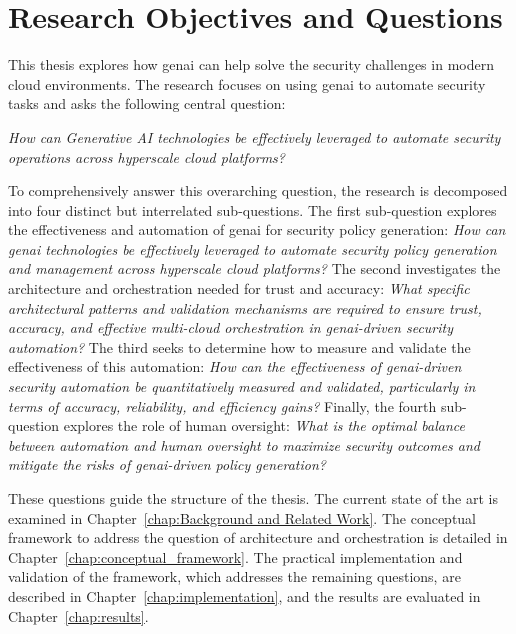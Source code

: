 \section{Research Objectives and Questions}
\label{sec:objectives_questions}

This thesis explores how \gls{genai} can help solve the security challenges in modern cloud environments. The research focuses on using \gls{genai} to automate security tasks and asks the following central question:

\textit{How can Generative AI technologies be effectively leveraged to automate security operations across hyperscale cloud platforms?}

To comprehensively answer this overarching question, the research is decomposed into four distinct but interrelated sub-questions.
The first sub-question explores the effectiveness and automation of \gls{genai} for security policy generation: \textit{How can \gls{genai} technologies be effectively leveraged to automate security policy generation and management across hyperscale cloud platforms?}
The second investigates the architecture and orchestration needed for trust and accuracy: \textit{What specific architectural patterns and validation mechanisms are required to ensure trust, accuracy, and effective multi-cloud orchestration in \gls{genai}-driven security automation?}
The third seeks to determine how to measure and validate the effectiveness of this automation: \textit{How can the effectiveness of \gls{genai}-driven security automation be quantitatively measured and validated, particularly in terms of accuracy, reliability, and efficiency gains?}
Finally, the fourth sub-question explores the role of human oversight: \textit{What is the optimal balance between automation and human oversight to maximize security outcomes and mitigate the risks of \gls{genai}-driven policy generation?}

These questions guide the structure of the thesis. The current state of the art is examined in Chapter~\ref{chap:Background and Related Work}. The conceptual framework to address the question of architecture and orchestration is detailed in Chapter~\ref{chap:conceptual_framework}. The practical implementation and validation of the framework, which addresses the remaining questions, are described in Chapter~\ref{chap:implementation}, and the results are evaluated in Chapter~\ref{chap:results}.

